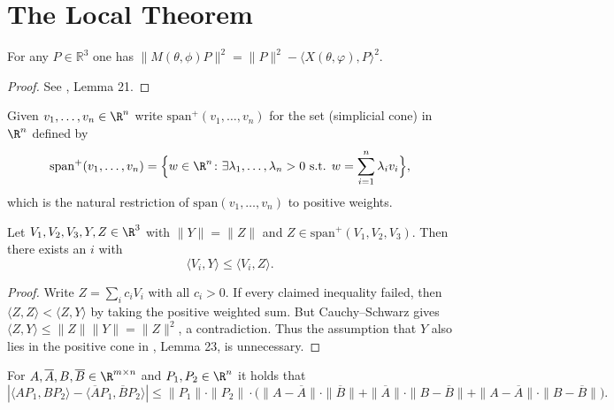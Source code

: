 \chapter{The Local Theorem}

\begin{lemma} \label{lem:pythagoras}
  \leanok
    For any $P \in \mathbb{R}^3$ one has
    $\big\|M(\theta, \phi) P\big\|^2=\|P\|^2-\langle X({\theta,\varphi}),P\rangle^2$.
\end{lemma}

\begin{proof}
\leanok
See \cite{polyhedron.without.rupert}, Lemma 21.
\end{proof}

\begin{definition} \label{def:spanp}
  \leanok
      Given $v_1, \dots, v_n \in \R^n$ write $\mathrm{span}^+(v_1,\dots,v_n)$ for the set (simplicial cone) in $\R^n$ defined by
    \[
        \mathrm{span}^+(v_1,\dots,v_n) = \Big\{ w \in \R^n \colon \exists \lambda_1,\dots,\lambda_n > 0 \text{ s.t. } w = \sum_{i=1}^n \lambda_i v_i \Big\},
    \]
    which is the natural restriction of $\mathrm{span}(v_1,\dots,v_n)$ to positive weights.
\end{definition}

\begin{lemma} \label{lem:langles}
  \leanok
Let $V_1,V_2,V_3,Y,Z \in \R^3$ with $\|Y \|=\| Z \|$ and $Z \in \mathrm{span}^+(V_1,V_2,V_3)$. Then there exists an $i$ with
\[
    \langle V_i, Y \rangle \leq \langle V_i, Z \rangle.
\]
\end{lemma}

\begin{proof}
\leanok
Write $Z=\sum_i c_iV_i$ with all $c_i>0$. If every claimed inequality failed,
then $\langle Z,Z\rangle<\langle Z,Y\rangle$ by taking the positive weighted sum.
But Cauchy--Schwarz gives
$\langle Z,Y\rangle\leq\|Z\|\|Y\|=\|Z\|^2$, a contradiction.
Thus the assumption that $Y$ also lies in the positive cone in
\cite{polyhedron.without.rupert}, Lemma 23, is unnecessary.
\end{proof}

\begin{lemma} \label{lem:scalarprodbars}
\leanok
    For $A,\overline{A},B,\overline{B}\in \R^{m\times n}$ and $P_1,P_2\in \R^n$ it holds that
    \[
        |\langle AP_1,BP_2\rangle-\langle \overline{A}P_1,\overline{B}P_2\rangle|\leq \|P_1\|\cdot \|P_2\|\cdot \Big( \|A-\overline{A}\|\cdot \|\overline{B}\| +  \|\overline{A}\|\cdot \|B-\overline{B}\|+\|A-\overline{A}\|\cdot \|B-\overline{B}\|\Big).
    \]
\end{lemma}


